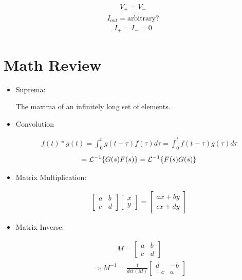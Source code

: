 \begin{itemize}
            \begin{align*} V_+ = V_- \end{align*}
            \begin{align*} I_{out} = \text{arbitrary?} \end{align*}
            \begin{align*} I_+ = I_- = 0 \end{align*}

    \end{itemize}

\section{Math Review}

    \begin{itemize}
        \item Suprema:

            The maxima of an infinitely long set of elements.

        \item Convolution

            \begin{align*} f(t) * g(t) = \int_0^t {g(t-\tau) f(\tau) d\tau} = \int_0^t {f(t-\tau) g(\tau) d\tau} \end{align*}
            \begin{align*} = \mathcal{L}^{-1}\{ G(s)F(s) \} = \mathcal{L}^{-1}\{ F(s)G(s) \} \end{align*}

        \item Matrix Multiplication:

            \begin{align*} \left[ \begin{array}{cc} a & b \\ c & d \end{array} \right] \left[ \begin{array}{c} x \\ y \end{array} \right] = \left[ \begin{array}{c} ax + by \\ cx + dy \end{array} \right] \end{align*}

        \item Matrix Inverse:

            \begin{align*} M = \left[ \begin{array}{cc} a & b \\ c & d \end{array} \right] \end{align*}
            \begin{align*} \Rightarrow M^{-1} =  \frac{1}{det(M)} \left[ \begin{array}{cc} d & -b \\ -c & a \end{array} \right]  \end{align*}


\end{itemize}
